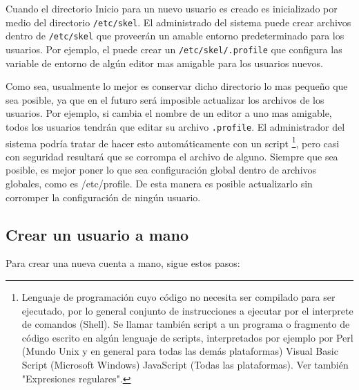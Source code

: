Cuando el directorio Inicio para un nuevo usuario es creado es
inicializado por medio del directorio \texttt{/etc/skel}. El
administrado del sistema puede crear archivos dentro de
\texttt{/etc/skel} que proveerán un amable entorno predeterminado
para los usuarios. Por ejemplo, el puede crear un
\texttt{/etc/skel/.profile} que configura  las variable de entorno
de algún editor mas amigable para los usuarios nuevos.


Como sea, usualmente lo mejor es conservar dicho directorio lo mas pequeño
que sea posible, ya que en el futuro será imposible actualizar los archivos de
los usuarios. Por ejemplo, si cambia el nombre de un editor a uno mas amigable,
todos los usuarios tendrán que editar su archivo  \texttt{.profile}.
El administrador del sistema podría tratar de hacer esto automáticamente con un
script
	\footnote{Lenguaje de programación cuyo código no necesita ser
compilado para ser ejecutado, por lo general conjunto de instrucciones a
ejecutar por el interprete de comandos (Shell). Se llamar también script a un
programa o fragmento de código escrito en algún lenguaje de scripts,
interpretados por ejemplo por Perl (Mundo Unix y en general para todas las demás
plataformas) Visual Basic Script (Microsoft Windows) JavaScript (Todas las
plataformas).  Ver también "Expresiones regulares".}, pero
	casi con seguridad resultará que se corrompa el archivo de
alguno.  Siempre que sea posible, es mejor poner lo que sea configuración global
dentro de archivos globales, como es /etc/profile. De esta manera es posible
actualizarlo sin corromper la configuración de ningún usuario.  






\subsection{Crear un usuario a mano}

Para crear una nueva cuenta a mano, sigue estos pasos:

